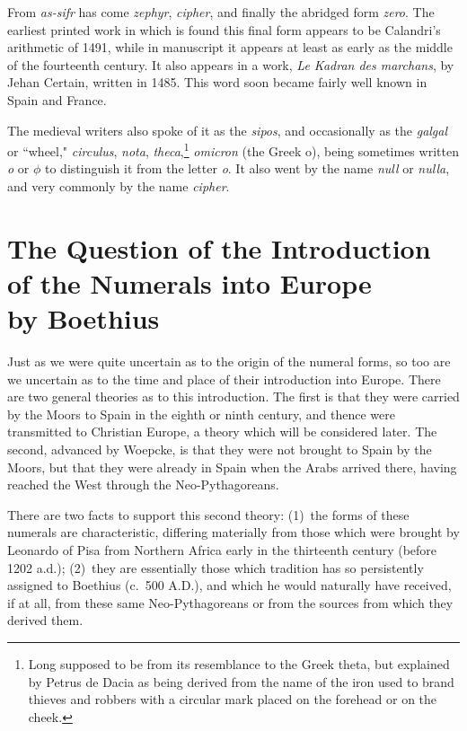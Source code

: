 \documentclass[11pt,a4paper]{article}
\begin{document}
From \textit{as-sifr} has come \textit{zephyr}, \textit{cipher}, and finally the abridged form \textit{zero}. The earliest printed work in which is found this final form appears to be Calandri's arithmetic of 1491, while in manuscript it appears at least as early as the middle of the fourteenth century. It also appears in a work, \textit{Le Kadran des marchans}, by Jehan Certain, written in 1485. This word soon became fairly well known in Spain and France.

The medieval writers also spoke of it as the \textit{sipos}, and occasionally as the \textit{galgal} or ``wheel," \textit{circulus}, \textit{nota}, \textit{theca},\footnote{Long supposed to be from its resemblance to the Greek theta, but explained by Petrus de Dacia as being derived from the name of the iron used to brand thieves and robbers with a circular mark placed on the forehead or on the cheek.} \textit{omicron} (the Greek o), being sometimes written \textit{o} or $\phi$ to distinguish it from the letter \textit{o}. It also went by the name \textit{null} or \textit{nulla}, and very commonly by the name \textit{cipher}.


\section[The Question of the Introduction of the Numerals into Europe by Boethius]{The Question of the Introduction of the Numerals into Europe\\ by Boethius}

Just as we were quite uncertain as to the origin of the numeral forms, so too are we uncertain as to the time and place of their introduction into Europe. There are two general theories as to this introduction. The first is that they were carried by the Moors to Spain in the eighth or ninth century, and thence were transmitted to Christian Europe, a theory which will be considered later. The second, advanced by Woepcke, is that they were not brought to Spain by the Moors, but that they were already in Spain when the Arabs arrived there, having reached the West through the Neo-Pythagoreans.

There are two facts to support this second theory: (1)~the forms of these numerals are characteristic, differing materially from those which were brought by Leonardo of Pisa from Northern Africa early in the thirteenth century (before 1202 a.d.); (2)~they are essentially those which tradition has so persistently assigned to Boethius (c.~500 A.D.), and which he would naturally have received, if at all, from these same Neo-Pythagoreans or from the sources from which they derived them.
\end{document}
